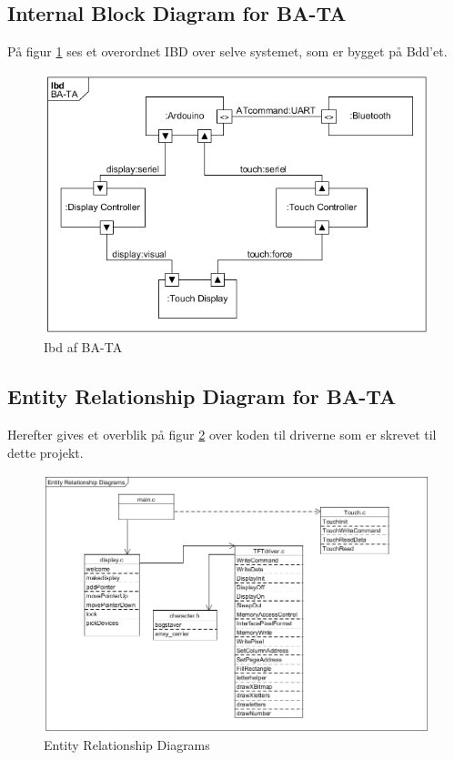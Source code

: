 \subsection{Internal Block Diagram for BA-TA}
På figur \ref{fig:Ibd} ses et overordnet IBD over selve systemet, som er bygget på Bdd'et. 
\begin{figure}[H]
	\centering
	\includegraphics[width = 300 pt]{Img/Ibd.png}
	\caption{Ibd af BA-TA}
	\label{fig:Ibd}
\end{figure}

\subsection{Entity Relationship Diagram for BA-TA}
Herefter gives et overblik på figur \ref{fig:Entity} over koden til driverne som er skrevet til dette projekt. 

\begin{figure}[H]
	\centering
	\includegraphics[width = 300 pt]{Img/Entity.png}
	\caption{Entity Relationship Diagrams}
	\label{fig:Entity}
\end{figure}


